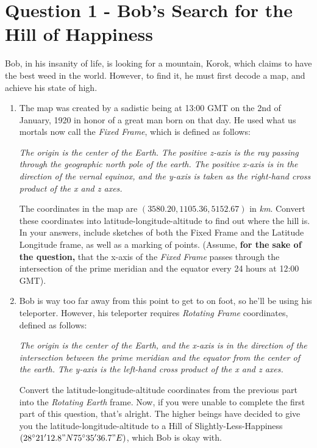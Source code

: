 \documentclass[a4paper, 12pt]{exam}
\begin{document}
	\pagebreak
	

	\section*{Question 1 - Bob's Search for the Hill of Happiness}
	Bob, in his insanity of life, is looking for a mountain, Korok, which claims to have the best weed in the world. However, to find it, he must first decode a map, and achieve his state of high.
	
	\begin{enumerate}[label=(\alph*)]
		\item The map was created by a sadistic being at 13:00 GMT on the 2nd of January, 1920 in honor of a great man born on that day. He used what us mortals now call the \textit{Fixed Frame}, which is defined as follows:
		\begin{center}
			\textit{The origin is the center of the Earth. The positive z-axis is the ray passing through the geographic north pole of the earth. The positive x-axis is in the direction of the vernal equinox, and the y-axis is taken as the right-hand cross product of the x and z axes.}
		\end{center}
		The coordinates in the map are $(3580.20,1105.36,5152.67)$ in \textit{km}. Convert these coordinates into latitude-longitude-altitude to find out where the hill is. In your answers, include sketches of both the Fixed Frame and the Latitude Longitude frame, as well as a marking of points. (Assume, \textbf{for the sake of the question,} that the x-axis of the\textit{ Fixed Frame} passes through the intersection of the prime meridian and the equator every 24 hours at 12:00 GMT).
		
		\item Bob is way too far away from this point to get to on foot, so he'll be using his teleporter. However, his teleporter requires \textit{Rotating Frame} coordinates, defined as follows:
		\begin{center}
			\textit{The origin is the center of the Earth, and the x-axis is in the direction of the intersection between the prime meridian and the equator from the center of the earth. The y-axis is the left-hand cross product of the x and z axes.}
		\end{center}
		Convert the latitude-longitude-altitude coordinates from the previous part into the \textit{Rotating Earth} frame. Now, if you were unable to complete the first part of this question, that's alright. The higher beings have decided to give you the latitude-longitude-altitude to a Hill of Slightly-Less-Happiness  $(28\degree21'12.8"N 75\degree35'36.7"E)$, which Bob is okay with. 
		

\end{enumerate}
\end{document}
